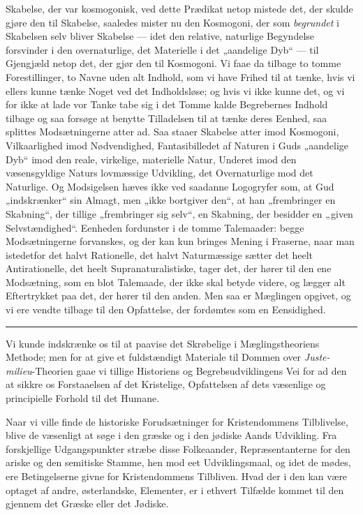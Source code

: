 \documentclass[12pt,a4paper,openany]{book}
\newcommand{\opage}[1]{\marginnote{\footnotesize\textit{[#1]}}}
\begin{document}
Skabelse, der var kosmogonisk, ved dette Prædikat netop mistede
det, der skulde gjøre den til Skabelse, saaledes mister nu den
Kosmogoni, der som \emph{begrundet} i Skabelsen selv bliver
Skabelse --- idet den relative, naturlige Begyndelse forsvinder
i den overnaturlige, det Materielle i det „aandelige Dyb“ --- til
\opage{442}Gjengjæld netop det, der gjør den til Kosmogoni. Vi faae
da tilbage to tomme Forestillinger, to Navne uden alt Indhold,
som vi have Frihed til at tænke, hvis vi ellers kunne
tænke Noget ved det Indholdsløse; og hvis vi ikke kunne det,
og vi for ikke at lade vor Tanke tabe sig i det Tomme kalde
Begrebernes Indhold tilbage og saa forsøge at benytte Tilladelsen
til at tænke deres Eenhed, saa splittes Modsætningerne
atter ad. Saa staaer Skabelse atter imod Kosmogoni, Vilkaarlighed
imod Nødvendighed, Fantasibilledet af Naturen
i Guds „aandelige Dyb“ imod den reale, virkelige, materielle
Natur, Underet imod den væsensgyldige Naturs lovmæssige
Udvikling, det Overnaturlige mod det Naturlige. Og Modsigelsen
hæves ikke ved saadanne Logogryfer som, at Gud
„indskrænker“ sin Almagt, men „ikke bortgiver den“, at han
„frembringer en Skabning“, der tillige „frembringer sig selv“,
en Skabning, der besidder en „given Selvstændighed“. Eenheden
fordunster i de tomme Talemaader: begge Modsætningerne
forvanskes, og der kan kun bringes Mening i Fraserne,
naar man istedetfor det halvt Rationelle, det halvt
Naturmæssige sætter det heelt Antirationelle, det heelt Supranaturalistiske,
tager det, der hører til den ene Modsætning,
som en blot Talemaade, der ikke skal betyde videre, og lægger
alt Eftertrykket paa det, der hører til den anden. Men saa
er Mæglingen opgivet, og vi ere vendte tilbage til den Opfattelse,
der fordømtes som en Eensidighed.

\begin{center}\rule{1.8cm}{0.4pt}\end{center}

Vi kunde indskrænke os til at paavise det Skrøbelige i
Mæglingstheoriens Methode; men for at give et fuldstændigt
Materiale til Dommen over \textit{Juste-milieu}-Theorien gaae
vi tillige Historiens og Begrebsudviklingens Vei for ad den
at sikkre os Forstaaelsen af det Kristelige, Opfattelsen af
dets væsenlige og principielle Forhold til det Humane.

Naar vi ville finde de historiske Forudsætninger for
Kristendommens Tilblivelse, blive de væsenligt at søge i den
græske og i den jødiske Aands Udvikling. Fra forskjellige
\opage{443}Udgangspunkter stræbe disse Folkeaander, Repræsentanterne
for den ariske og den semitiske Stamme, hen mod eet Udviklingsmaal,
og idet de mødes, ere Betingelserne givne for
Kristendommens Tilbliven. Hvad der i den kan være optaget
af andre, østerlandske, Elementer, er i ethvert Tilfælde
kommet til den gjennem det Græske eller det Jødiske.
\end{document}

